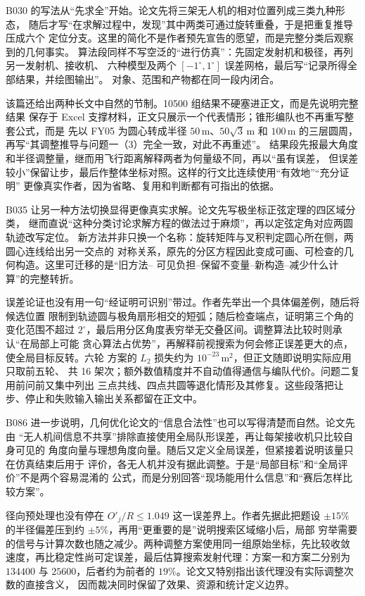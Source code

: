B030 的写法从“先求全”开始。论文先将三架无人机的相对位置列成三类九种形态，
随后才写“在求解过程中，发现”其中两类可通过旋转重叠，于是把重复推导压成六个
定位分支。这里的简化不是作者预先宣告的愿望，而是完整分类后观察到的几何事实。
算法段同样不写空泛的“进行仿真”：先固定发射机和极径，再列另一发射机、接收机、
六种模型及两个 $[-1^\circ,1^\circ]$ 误差网格，最后写“记录所得全部结果，并绘图输出”。
对象、范围和产物都在同一段内闭合。

该篇还给出两种长文中自然的节制。10500 组结果不硬塞进正文，而是先说明完整结果
保存于 Excel 支撑材料，正文只展示一个代表情形；锥形编队也不再重写整套公式，而是
先以 FY05 为圆心转成半径 $50\,\mathrm{m}$、$50\sqrt{3}\,\mathrm{m}$ 和
$100\,\mathrm{m}$ 的三层圆周，再写“其调整推导与问题一（3）完全一致，对此不再重述”。
结果段先报最大角度和半径调整量，继而用飞行距离解释两者为何量级不同，再以“虽有误差，
但误差较小”保留让步，最后作整体坐标对照。这样的行文比连续使用“有效地”“充分证明”
更像真实作者，因为省略、复用和判断都有可指出的依据。

B035 让另一种方法切换显得更像真实求解。论文先写极坐标正弦定理的四区域分类，
继而直说“这种分类讨论求解方程的做法过于麻烦”，再以定弦定角对应两圆轨迹改写定位。
新方法并非只换一个名称：旋转矩阵与叉积判定圆心所在侧，两圆心连线给出另一交点的
对称关系，原先的分区方程因此变成可画、可检查的几何构造。这里可迁移的是“旧方法--
可见负担--保留不变量--新构造--减少什么计算”的完整转折。

误差论证也没有用一句“经证明可识别”带过。作者先举出一个具体偏差例，随后将候选位置
限制到轨迹圆与极角扇形相交的短弧；随后检查端点，证明第三个角的变化范围不超过
$2^\circ$，最后用分区角度表穷举无交叠区间。调整算法比较时则承认“在局部上可能
贪心算法占优势”，再解释前视搜索为何会修正误差更大的点，使全局目标反转。六轮
方案的 $L_2$ 损失约为 $10^{-23}\,\mathrm{m}^2$，但正文随即说明实际应用只取前五轮、
共 16 架次；额外数值精度并不自动值得通信与编队代价。问题二复用前问前又集中列出
三点共线、四点共圆等退化情形及其修复。这些段落把让步、停止和失败输入输出关系都留在正文中。

B086 进一步说明，几何优化论文的“信息合法性”也可以写得清楚而自然。论文先由
“无人机间信息不共享”排除直接使用全局队形误差，再让每架接收机只比较自身可见的
角度向量与理想角度向量。随后又定义全局误差，但紧接着说明该量只在仿真结束后用于
评价，各无人机并没有据此调整。于是“局部目标”和“全局评价”不是两个容易混淆的
公式，而是分别回答“现场能用什么信息”和“赛后怎样比较方案”。

径向预处理也没有停在 $O'_j/R\leq1.049$ 这一误差界上。作者先据此把题设
$\pm15\%$ 的半径偏差压到约 $\pm5\%$，再用“更重要的是”说明搜索区域缩小后，局部
穷举需要的信号与计算次数也随之减少。两种调整方案使用同一组原始坐标，先比较收敛
速度，再比稳定性尚可定误差，最后估算搜索发射代理：方案一和方案二分别为 $134400$ 与
$25600$，后者约为前者的 $19\%$。论文又特别指出该代理没有实际调整次数的直接含义，
因而裁决同时保留了效果、资源和统计定义边界。


